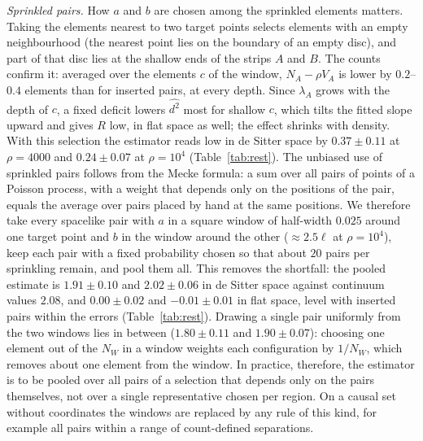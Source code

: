 \documentclass[prd,twocolumn,superscriptaddress,nofootinbib,amsmath,amssymb,floatfix]{revtex4-2}
\begin{document}
\emph{Sprinkled pairs.} How $a$ and $b$ are chosen among the sprinkled elements matters. Taking the elements nearest to two target points selects elements with an empty neighbourhood (the nearest point lies on the boundary of an empty disc), and part of that disc lies at the shallow ends of the strips $A$ and $B$. The counts confirm it: averaged over the elements $c$ of the window, $N_A-\rho V_A$ is lower by $0.2$--$0.4$ elements than for inserted pairs, at every depth. Since $\lambda_A$ grows with the depth of $c$, a fixed deficit lowers $\widehat{d^2}$ most for shallow $c$, which tilts the fitted slope upward and gives $R$ low, in flat space as well; the effect shrinks with density. With this selection the estimator reads low in de Sitter space by $0.37\pm0.11$ at $\rho=4000$ and $0.24\pm0.07$ at $\rho=10^4$ (Table~\ref{tab:rest}). The unbiased use of sprinkled pairs follows from the Mecke formula: a sum over all pairs of points of a Poisson process, with a weight that depends only on the positions of the pair, equals the average over pairs placed by hand at the same positions. We therefore take every spacelike pair with $a$ in a square window of half-width $0.025$ around one target point and $b$ in the window around the other ($\approx2.5\ell$ at $\rho=10^4$), keep each pair with a fixed probability chosen so that about $20$ pairs per sprinkling remain, and pool them all. This removes the shortfall: the pooled estimate is $1.91\pm0.10$ and $2.02\pm0.06$ in de Sitter space against continuum values $2.08$, and $0.00\pm0.02$ and $-0.01\pm0.01$ in flat space, level with inserted pairs within the errors (Table~\ref{tab:rest}). Drawing a single pair uniformly from the two windows lies in between ($1.80\pm0.11$ and $1.90\pm0.07$): choosing one element out of the $N_W$ in a window weights each configuration by $1/N_W$, which removes about one element from the window. In practice, therefore, the estimator is to be pooled over all pairs of a selection that depends only on the pairs themselves, not over a single representative chosen per region. On a causal set without coordinates the windows are replaced by any rule of this kind, for example all pairs within a range of count-defined separations.
\end{document}
